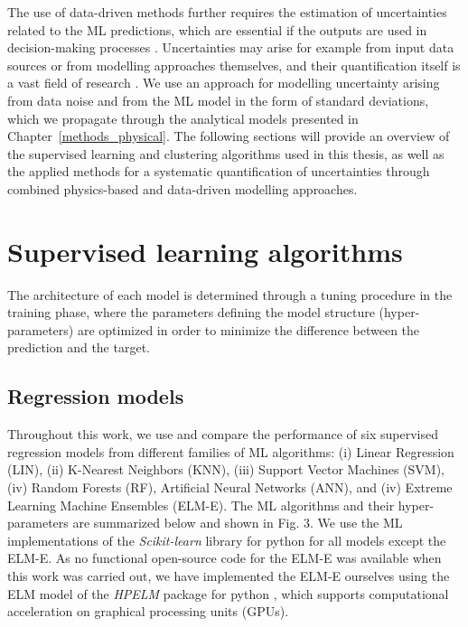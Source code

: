The use of data-driven methods further requires the estimation of uncertainties related to the ML predictions, which are essential if the outputs are used in decision-making processes \cite{knusel_argument-based_2020}. 
Uncertainties may arise for example from input data sources or from modelling approaches themselves, and their quantification itself is a vast field of research \cite{willard_integrating_2020,knusel_argument-based_2020}.
We use an approach for modelling uncertainty arising from data noise and from the ML model in the form of standard deviations, which we propagate through the analytical models presented in Chapter~\ref{methods_physical}. 
The following sections will provide an overview of the supervised learning and clustering algorithms used in this thesis, as well as the applied methods for a systematic quantification of uncertainties through combined physics-based and data-driven modelling approaches.

\section{Supervised learning algorithms}
\label{ML_supervised}
The architecture of each model is determined through a tuning procedure in the training phase, where the parameters defining the model structure (hyper-parameters) are optimized in order to minimize the difference between the prediction and the target. 

\subsection{Regression models}
\label{RF}
Throughout this work, we use and compare the performance of six supervised regression models from different families of ML algorithms: (i) Linear Regression (LIN), (ii) K-Nearest Neighbors (KNN), (iii) Support Vector Machines (SVM), (iv) Random Forests (RF), Artificial Neural Networks (ANN), and (iv) Extreme Learning Machine Ensembles (ELM-E).
The ML algorithms and their hyper-parameters are summarized below and shown in Fig. 3. 
We use the ML implementations of the \textit{Scikit-learn} library for python \cite{pedregosa_scikit-learn:_2011} for all models except the ELM-E. As no functional open-source code for the ELM-E was available when this work was carried out, we have implemented the ELM-E ourselves using the ELM model of the \textit{HPELM} package for python \cite{akusok_high-performance_2015}, which supports computational acceleration on graphical processing units (GPUs).


